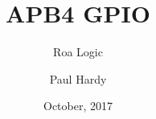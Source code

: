 
\usepackage{pkg/roalogictitle}



\title{APB4 GPIO}
\author{Roa Logic}
\date{October, 2017}
\author{Paul Hardy}

 
\pagestyle{fancy}
\fancyhf{}



\fancyhead[R]{\thepage}
